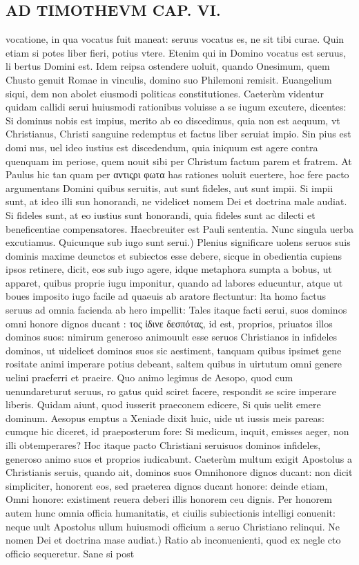 \documentclass{article}
\begin{document}
\begin{pages}
\section*{AD TIMOTHEVM CAP. VI. }
\marginpar{[ p.119 ]}\pstart vocatione, in qua vocatus fuit maneat: seruus vocatus es, ne sit tibi curae. Quin etiam si potes liber fieri, potius vtere. Etenim qui in Domino vocatus est seruus, li bertus Domini est. Idem reipsa ostendere uoluit, quando Onesimum, quem Chusto genuit Romae in vinculis, domino suo Philemoni remisit. Euangelium siqui, dem non abolet eiusmodi politicas constitutiones. Caeterùm videntur quidam callidi serui huiusmodi rationibus voluisse a se iugum excutere, dicentes: Si dominus nobis est impius, merito ab eo discedimus, quia non est aequum, vt Christianus, Christi sanguine redemptus et factus liber seruiat impio. Sin pius est domi nus, uel ideo iustius est discedendum, quia iniquum est agere contra quenquam im periose, quem nouit sibi per Christum factum parem et fratrem. At Paulus hic tan quam per αντιςρι φωτα has rationes uoluit euertere, hoc fere pacto argumentans Domini quibus seruitis, aut sunt fideles, aut sunt impii. Si impii sunt, at ideo illi sun honorandi, ne videlicet nomem Dei et doctrina male audiat. Si fideles sunt, at eo iustius sunt honorandi, quia fideles sunt ac dilecti et beneficentiae compensatores. Haecbreuiter est Pauli sententia. Nunc singula uerba excutiamus.  \pend\pstart Quicunque sub iugo sunt serui.) Plenius significare uolens seruos suis dominis maxime deunctos et subiectos esse debere, sicque in obedientia cupiens ipsos retinere, dicit, eos sub iugo agere, idque metaphora sumpta a bobus, ut apparet, quibus proprie iugu imponitur, quando ad labores educuntur, atque ut boues imposito iugo facile ad quaeuis ab aratore flectuntur: lta homo factus seruus ad omnia facienda ab hero impellit: Tales itaque facti serui, suos dominos omni honore dignos ducant : τος ἰδινε δεσπότας, id est, proprios, priuatos illos dominos suos: nimirum generoso animouult esse seruos Christianos in infideles dominos, ut uidelicet dominos suos sic aestiment, tanquam quibus ipsimet gene rositate animi imperare potius debeant, saltem quibus in uirtutum omni genere uelini praeferri et praeire. Quo animo legimus de Aesopo, quod cum uenundareturut seruus, ro gatus quid sciret facere, respondit se scire imperare liberis. Quidam aiunt, quod iusserit praeconem edicere, Si quis uelit emere dominum. Aesopus emptus a Xeniade dixit huic, uide ut iussis meis pareas: cumque hic diceret, id praeposterum fore: Si medicum, inquit, emisses aeger, non illi obtemperares? Hoc itaque pacto Christiani seruisuos dominos infideles, generoso animo suos et proprios iudicabunt. Caeterùm multum exigit Apostolus a Christianis seruis, quando ait, dominos suos Omnihonore dignos ducant: non dicit simpliciter, honorent eos, sed praeterea dignos ducant honore: deinde etiam, Omni honore: existiment reuera deberi illis honorem ceu dignis. Per honorem autem hunc omnia officia humanitatis, et ciuilis subiectionis intelligi conuenit: neque uult Apostolus ullum huiusmodi officium a seruo Christiano relinqui.  \pend\pstart Ne nomen Dei et doctrina mase audiat.) Ratio ab inconuenienti, quod ex negle cto officio sequeretur. Sane si post 
\end{pages}
\end{document}
